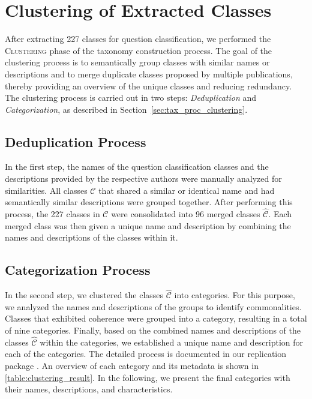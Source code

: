 
\section{Clustering of Extracted Classes}
\label{sec:taxonomy_clustering}

After extracting 227 classes for question classification, we performed the \textsc{Clustering} phase of the taxonomy construction process. The goal of the clustering process is to semantically group classes with similar names or descriptions and to merge duplicate classes proposed by multiple publications, thereby providing an overview of the unique classes and reducing redundancy. The clustering process is carried out in two steps: \emph{Deduplication} and \emph{Categorization}, as described in Section~\ref{sec:tax_proc_clustering}.

\subsection{Deduplication Process}
In the first step, the names of the question classification classes and the descriptions provided by the respective authors were manually analyzed for similarities. All classes $\mathcal{C}$ that shared a similar or identical name and had semantically similar descriptions were grouped together. After performing this process, the 227 classes in $\mathcal{C}$ were consolidated into 96 merged classes $\hat{\mathcal{C}}$. Each merged class was then given a unique name and description by combining the names and descriptions of the classes within it.

\subsection{Categorization Process}
In the second step, we clustered the classes $\hat{\mathcal{C}}$ into categories. For this purpose, we analyzed the names and descriptions of the groups to identify commonalities. Classes that exhibited coherence were grouped into a category, resulting in a total of nine categories. Finally, based on the combined names and descriptions of the classes $\hat{\mathcal{C}}$ within the categories, we established a unique name and description for each of the categories. The detailed process is documented in our replication package \cite{schneider_replication_2025}. An overview of each category and its metadata is shown in \autoref{table:clustering_result}. In the following, we present the final categories with their names, descriptions, and characteristics.

